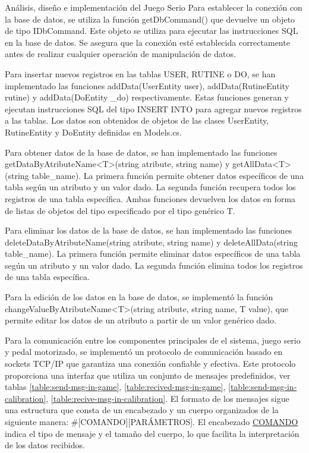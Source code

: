 \begin{thesischapter}{2} {Análisis, diseño e implementación del Juego Serio}
Para establecer la conexión con la base de datos, se utiliza la función getDbCommand() que devuelve un objeto de tipo IDbCommand. Este objeto se utiliza para ejecutar las instrucciones SQL en 
la base de datos. Se asegura que la conexión esté establecida correctamente antes de realizar cualquier operación de manipulación de datos.

Para insertar nuevos registros en las tablas USER, RUTINE o DO, se han implementado las funciones addData(UserEntity user), addData(RutineEntity rutine) y addData(DoEntity \_do) respectivamente. 
Estas funciones generan y ejecutan instrucciones SQL del tipo INSERT INTO para agregar nuevos registros a las tablas. Los datos son obtenidos de objetos de las clases UserEntity, RutineEntity y DoEntity
definidas en Models.cs.

Para obtener datos de la base de datos, se han implementado las funciones getDataByAtributeName<T>(string atribute, string name) y getAllData<T>(string table\_name). 
La primera función permite obtener datos específicos de una tabla según un atributo y un valor dado. La segunda función recupera todos los registros de una tabla específica. 
Ambas funciones devuelven los datos en forma de listas de objetos del tipo especificado por el tipo genérico T.

Para eliminar los datos de la base de datos, se han implementado las funciones deleteDataByAtributeName(string atribute, string name) y deleteAllData(string table\_name). 
La primera función permite eliminar datos específicos de una tabla según un atributo y un valor dado. La segunda función elimina todos los registros de una tabla específica. 

Para la edición de los datos en la base de datos, se implementó la función changeValueByAtributeName<T>(string atribute, string name, T value), que 
permite editar los datos de un atributo a partir de un valor genérico dado.

Para la comunicación entre los componentes principales de el sistema, juego serio y pedal motorizado, se implementó un protocolo de comunicación basado en sockets TCP/IP que garantiza una conexión confiable y efectiva. Este protocolo proporciona una interfaz que utiliza un conjunto de mensajes predefinidos, ver tablas 
\ref{table:send-msg-in-game}, 
\ref{table:recived-msg-in-game}, 
\ref{table:send-msg-in-calibration}, 
\ref{table:recive-msg-in-calibration}. El formato de los mensajes sigue una estructura que consta de un encabezado y un cuerpo organizados de la siguiente manera: \#[COMANDO][PARÁMETROS]. El encabezado \underline{COMANDO} indica el tipo de mensaje y el tamaño del cuerpo, lo que facilita la interpretación de los datos recibidos.


\end{thesischapter}

